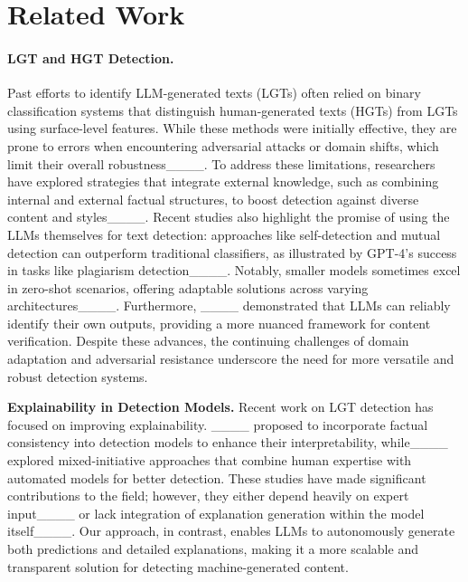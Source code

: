 \section{Related Work}
\paragraph{LGT and HGT Detection.}
Past efforts to identify LLM-generated texts (LGTs) often relied on binary classification systems that distinguish human-generated texts (HGTs) from LGTs using surface-level features. While these methods were initially effective, they are prone to errors when encountering adversarial attacks or domain shifts, which limit their overall robustness____. To address these limitations, researchers have explored strategies that integrate external knowledge, such as combining internal and external factual structures, to boost detection against diverse content and styles____. Recent studies also highlight the promise of using the LLMs themselves for text detection: approaches like self-detection and mutual detection can outperform traditional classifiers, as illustrated by GPT-4's success in tasks like plagiarism detection____. Notably, smaller models sometimes excel in zero-shot scenarios, offering adaptable solutions across varying architectures____. Furthermore, ____ demonstrated that LLMs can reliably identify their own outputs, providing a more nuanced framework for content verification. Despite these advances, the continuing challenges of domain adaptation and adversarial resistance underscore the need for more versatile and robust detection systems.



\textbf{Explainability in Detection Models.}
Recent work on LGT detection has focused on improving explainability. ____ proposed to incorporate factual consistency into detection models to enhance their interpretability, while____ explored mixed-initiative approaches that combine human expertise with automated models for better detection. These studies have made significant contributions to the field; however, they either depend heavily on expert input____ or lack integration of explanation generation within the model itself____. Our approach, in contrast, enables LLMs to autonomously generate both predictions and detailed explanations, making it a more scalable and transparent solution for detecting machine-generated content.

